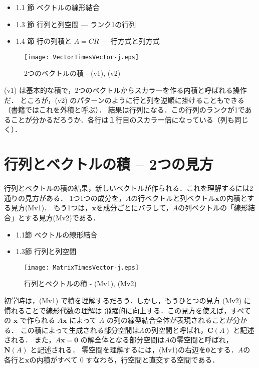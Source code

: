 \documentclass[letterpaper]{article}
\begin{document}
\begin{itemize}
  \item 1.1 節 ベクトルの線形結合
  \item 1.3 節 行列と列空間 --- ランク1の行列
  \item 1.4 節 行の列積と $A=CR$ \; --- 行方式と列方式
\end{itemize} 


\begin{figure}[H]
  \centering
  \texttt{[image: VectorTimesVector-j.eps]}
  \caption{2つのベクトルの積 - (v1), (v2)}
\end{figure}

(v1) は基本的な積で，2つのベクトルからスカラーを作る内積と呼ばれる操作だ．
ところが，(v2) のパターンのように行と列を逆順に掛けることもできる（書籍ではこれを外積と呼ぶ）．
結果は行列になる．この行列のランクが1であることが分かるだろうか．各行は１行目のスカラー倍になっている（列も同じく）．

\section{行列とベクトルの積 -- 2つの見方}

行列とベクトルの積の結果，新しいベクトルが作られる．これを理解するには2通りの見方がある．
1つ1つの成分を，$A$の行ベクトルと列ベクトル$\bm{x}$の内積とする見方(Mv1)．
もう1つは，$\bm{x}$を成分ごとにバラして，$A$の列ベクトルの「線形結合」とする見方(Mv2)である．

\begin{itemize}
  \item 1.1節 ベクトルの線形結合
  \item 1.3節 行列と列空間
\end{itemize} 

\begin{figure}[H]
  \centering
  \texttt{[image: MatrixTimesVector-j.eps]}
  \caption{行列とベクトルの積 - (Mv1), (Mv2)}
\end{figure}

初学時は，(Mv1) で積を理解するだろう．しかし，もうひとつの見方 (Mv2) に慣れることで線形代数の理解は
飛躍的に向上する．この見方を使えば，すべての $\bm{x}$ で作られる $A\bm{x}$ によって $A$ の列の線型結合全体が表現されることが分かる．
この積によって生成される部分空間は$A$の列空間と呼ばれ，$\mathbf{C}(A)$ と記述される．
また，$A\bm{x}=\bm{0}$ の解全体となる部分空間は$A$の零空間と呼ばれ，$\mathbf{N}(A)$ と記述される．
零空間を理解するには，(Mv1)の右辺を$\bm{0}$とする．$A$の各行と$\bm{x}$の内積がすべて $0$ すなわち，行空間と直交する空間である．
\end{document}
